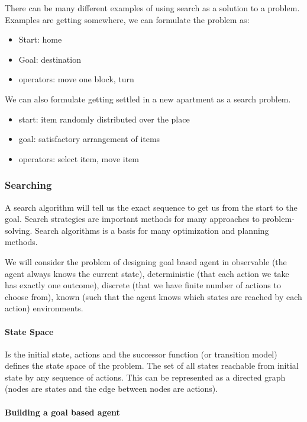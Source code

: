 \documentclass{article}
\begin{document}
There can be many different examples of using search as a solution to a problem.
Examples are getting somewhere, we can formulate the problem as:
\begin{itemize}
  \item Start: home
  \item Goal: destination
  \item operators: move one block, turn
\end{itemize}


We can also formulate getting settled in a new apartment as a search problem.
\begin{itemize}
  \item start: item randomly distributed over the place
  \item goal: satisfactory arrangement of items
  \item operators: select item, move item
\end{itemize}

\subsubsection{Searching}%
\label{ssub:search}

A search algorithm will tell us the exact sequence to get us from the start to
the goal. Search strategies are important methods for many approaches to
problem-solving. Search algorithms is a basis for many optimization and planning
methods.

We will consider the problem of designing goal based agent in observable (the
agent always knows the current state), deterministic (that each action we take
has exactly one outcome), discrete (that we have finite number of actions to
choose from), known (such that the agent knows which states are reached by each
action) environments\cite[p. 66]{book:artificial_intelligence_modern_approach}. 


\paragraph{State Space}
Is the initial state, actions and the successor function (or transition model)
defines the state space of the problem.  The set of all states reachable from
initial state by any sequence of actions.  This can be represented as a directed
graph (nodes are states and the edge between nodes are actions).  

\paragraph{Building a goal based agent}
\end{document}
